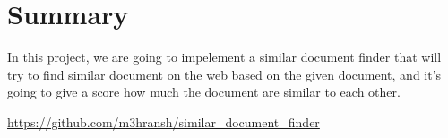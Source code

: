 \section*{Summary}
In this project, we are going to impelement a similar document finder
that will try to find similar document on the web based on the given document,
and it's going to give a score how much the document are similar to each other.

\href{https://github.com/m3hransh/similar_document_finder}{https://github.com/m3hransh/similar_document_finder}